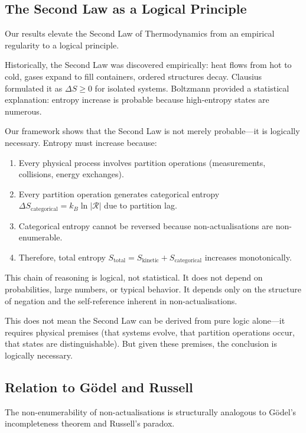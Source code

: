 \documentclass[twocolumn,10pt]{article}
\theoremstyle{definition}
\theoremstyle{remark}
\begin{document}
\subsection{The Second Law as a Logical Principle}

Our results elevate the Second Law of Thermodynamics from an empirical regularity to a logical principle.

Historically, the Second Law was discovered empirically: heat flows from hot to cold, gases expand to fill containers, ordered structures decay. Clausius formulated it as $\Delta S \geq 0$ for isolated systems. Boltzmann provided a statistical explanation: entropy increase is probable because high-entropy states are numerous.

Our framework shows that the Second Law is not merely probable—it is logically necessary. Entropy must increase because:

\begin{enumerate}
\item Every physical process involves partition operations (measurements, collisions, energy exchanges).
\item Every partition operation generates categorical entropy $\Delta S_{\text{categorical}} = k_B \ln|\mathcal{R}|$ due to partition lag.
\item Categorical entropy cannot be reversed because non-actualisations are non-enumerable.
\item Therefore, total entropy $S_{\text{total}} = S_{\text{kinetic}} + S_{\text{categorical}}$ increases monotonically.
\end{enumerate}

This chain of reasoning is logical, not statistical. It does not depend on probabilities, large numbers, or typical behavior. It depends only on the structure of negation and the self-reference inherent in non-actualisations.

This does not mean the Second Law can be derived from pure logic alone—it requires physical premises (that systems evolve, that partition operations occur, that states are distinguishable). But given these premises, the conclusion is logically necessary.

\subsection{Relation to Gödel and Russell}

The non-enumerability of non-actualisations is structurally analogous to Gödel's incompleteness theorem and Russell's paradox.
\end{document}
